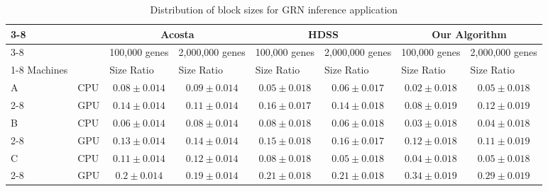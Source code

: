 \documentclass[journal]{IEEEtran}
\begin{document}
\begin{table}[htb]
\centering
\caption{Distribution of block sizes for GRN inference application}
\begin{scriptsize}
\begin{tabular}{|l|l|l|l|l|l|l|l|}
\cline{3-8}
\multicolumn{1}{l}{} &  & \multicolumn{2}{c|}{Acosta} & \multicolumn{2}{c|}{HDSS} & \multicolumn{2}{c|}{Our Algorithm} \\ 
\cline{3-8}
\multicolumn{1}{l}{} &  & \multicolumn{1}{c|}{100,000 genes} & \multicolumn{1}{c|}{2,000,000 genes} & \multicolumn{1}{c|}{100,000 genes} & \multicolumn{1}{c|}{2,000,000 genes} & \multicolumn{1}{c|}{100,000 genes} & \multicolumn{1}{c|}{2,000,000 genes} \\ 
\cline{1-8}
\multicolumn{1}{|c}{} Machines &  & Size Ratio & Size Ratio & Size Ratio & Size Ratio & Size Ratio & Size Ratio \\ 
\hline
A & CPU & \multicolumn{1}{c|}{$0.08 \pm 0.014$} & \multicolumn{1}{c|}{$0.09 \pm 0.014$} & \multicolumn{1}{c|}{$0.05 \pm 0.018$} & \multicolumn{1}{c|}{$0.06 \pm 0.017$}& \multicolumn{1}{c|}{$0.02 \pm 0.018$} & \multicolumn{1}{c|}{$0.05 \pm 0.018$} \\ 
\cline{2-8}
 & GPU & \multicolumn{1}{c|}{$0.14 \pm 0.014$} & \multicolumn{1}{c|}{$0.11 \pm 0.014$} & \multicolumn{1}{c|}{$0.16 \pm 0.017$} & \multicolumn{1}{c|}{$0.14 \pm 0.018$} & \multicolumn{1}{c|}{$0.08 \pm 0.019$} & \multicolumn{1}{c|}{$0.12 \pm 0.019$} \\ 
\hline
B & CPU & \multicolumn{1}{c|}{$0.06 \pm 0.014$} & \multicolumn{1}{c|}{$0.08 \pm 0.014$} & \multicolumn{1}{c|}{$0.08 \pm 0.018$} & \multicolumn{1}{c|}{$0.06 \pm 0.018$} & \multicolumn{1}{c|}{$0.03 \pm 0.018$} & \multicolumn{1}{c|}{$0.04 \pm 0.018$} \\ 
\cline{2-8}
 & GPU & \multicolumn{1}{c|}{$0.13 \pm 0.014$} & \multicolumn{1}{c|}{$0.14 \pm 0.014$} & \multicolumn{1}{c|}{$0.15 \pm 0.018$} & \multicolumn{1}{c|}{$0.16 \pm 0.017$} & \multicolumn{1}{c|}{$0.12 \pm 0.018$} & \multicolumn{1}{c|}{$0.11 \pm 0.019$} \\ 
\hline
C & CPU & \multicolumn{1}{c|}{$0.11 \pm 0.014$} & \multicolumn{1}{c|}{$0.12 \pm 0.014$} & \multicolumn{1}{c|}{$0.08 \pm 0.018$} & \multicolumn{1}{c|}{$0.05 \pm 0.018$} & \multicolumn{1}{c|}{$0.04 \pm 0.018$} & \multicolumn{1}{c|}{$0.05 \pm 0.018$} \\ 
\cline{2-8}
 & GPU & \multicolumn{1}{c|}{$0.2 \pm 0.014$} & \multicolumn{1}{c|}{$0.19 \pm 0.014$} & \multicolumn{1}{c|}{$0.21 \pm 0.018$} & \multicolumn{1}{c|}{$0.21 \pm 0.018$} & \multicolumn{1}{c|}{$0.34 \pm 0.019$} & \multicolumn{1}{c|}{$0.29 \pm 0.019$} \\ 

\end{tabular}
\end{scriptsize}
\end{table}
\end{document}
